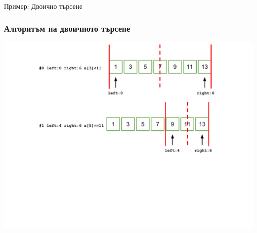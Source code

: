 \documentclass{beamer}
\begin{document}
\begin{frame}
\centerline{Пример: Двоично търсене}
\end{frame}

\begin{frame}[fragile]
\frametitle{Алгоритъм на двоичното търсене}

\includegraphics[width=14cm]{images/binsearch} 

\end{frame}
\end{document}
